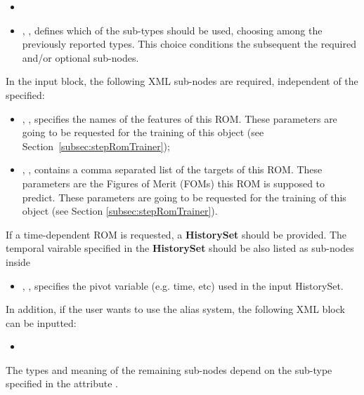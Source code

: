 %
\attrsIntro
%
\vspace{-5mm}
\begin{itemize}
  \itemsep0em
  \item \nameDescription
  \item {}, , defines which of
  the sub-types should be used, choosing among the previously reported
  types.
  This choice conditions the subsequent the required and/or optional
   sub-nodes.
\end{itemize}
\vspace{-5mm}

In the  input block, the following XML sub-nodes are required,
independent of the  specified:
%
\begin{itemize}
   \item {}, ,
     specifies the names of the features of this ROM.
   \nb These parameters are going to be requested for the training of this object
    (see Section~\ref{subsec:stepRomTrainer});
    \item {}, ,
      contains a comma separated list of the targets of this ROM. These parameters
      are the Figures of Merit (FOMs) this ROM is supposed to predict.
    \nb These parameters are going to be requested for the training of this
    object (see Section \ref{subsec:stepRomTrainer}).
\end{itemize}

If a time-dependent ROM is requested, a \textbf{HistorySet} should be provided.
The temporal vairable specified in the \textbf{HistorySet} should be also listed
as sub-nodes inside 
%
\begin{itemize}
  \item {}, , specifies the pivot
    variable (e.g. time, etc) used in the input HistorySet.
\end{itemize}
%
In addition, if the user wants to use the alias system, the following XML block can be inputted:
\begin{itemize}
  \item {}
\end{itemize}


The types and meaning of the remaining sub-nodes depend on the sub-type
specified in the attribute .

